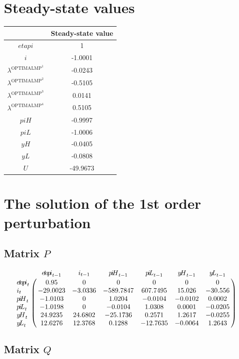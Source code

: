 

\section{Steady-state values}


\begin{tabular}{c|c|}
  & Steady-state value\\
\hline
${e\!t\!a\!p\!i}$ & 1 \\
$i$ & -1.0001 \\
$\lambda^{\mathrm{OPTIMALMP}^{\mathrm{1}}}$ & -0.0243 \\
$\lambda^{\mathrm{OPTIMALMP}^{\mathrm{2}}}$ & -0.5105 \\
$\lambda^{\mathrm{OPTIMALMP}^{\mathrm{3}}}$ & 0.0141 \\
$\lambda^{\mathrm{OPTIMALMP}^{\mathrm{4}}}$ & 0.5105 \\
${p\!i\!H}$ & -0.9997 \\
${p\!i\!L}$ & -1.0006 \\
${y\!H}$ & -0.0405 \\
${y\!L}$ & -0.0808 \\
$U$ & -49.9673 \\
\hline
\end{tabular}


\section{The solution of the 1st order perturbation}

\subsection*{Matrix $P$}

$$\bordermatrix{
~ & {e\!t\!a\!p\!i}_{t-1} & i_{t-1} & {p\!i\!H}_{t-1} & {p\!i\!L}_{t-1} & {y\!H}_{t-1} & {y\!L}_{t-1} \cr
{e\!t\!a\!p\!i}_{t} & 0.95 & 0 & 0 & 0 & 0 & 0 \cr
i_{t} & -29.0023 & -3.0336 & -589.7847 & 607.7495 & 15.026 & -30.556 \cr
{p\!i\!H}_{t} & -1.0103 & 0 & 1.0204 & -0.0104 & -0.0102 & 0.0002 \cr
{p\!i\!L}_{t} & -1.0198 & 0 & -0.0104 & 1.0308 & 0.0001 & -0.0205 \cr
{y\!H}_{t} & 24.9235 & 24.6802 & -25.1736 & 0.2571 & 1.2617 & -0.0255 \cr
{y\!L}_{t} & 12.6276 & 12.3768 & 0.1288 & -12.7635 & -0.0064 & 1.2643 \cr
}$$

\subsection*{Matrix $Q$}

